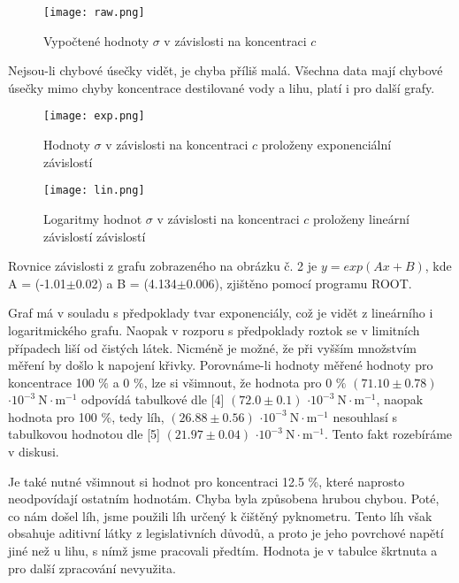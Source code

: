\documentclass[a4paper]{article}
\begin{document}
\begin{figure}[H]
\centering
\texttt{[image: raw.png]}
\caption{Vypočtené hodnoty $\sigma$ v závislosti na koncentraci $c$ }
\end{figure}
\par Nejsou-li chybové úsečky vidět, je chyba příliš malá. Všechna data mají chybové úsečky mimo chyby koncentrace destilované vody a lihu, platí i pro další grafy.
\begin{figure}[H]
\centering
\texttt{[image: exp.png]}
\caption{Hodnoty $\sigma$ v závislosti na koncentraci $c$ proloženy exponenciální závislostí}
\end{figure}

\begin{figure}[H]
\centering
\texttt{[image: lin.png]}
\caption{Logaritmy hodnot $\sigma$ v závislosti na koncentraci $c$ proloženy lineární závislostí závislostí}
\end{figure}
\par Rovnice závislosti z grafu zobrazeného na obrázku č. 2 je $y = exp(Ax+B)$, kde A = (-1.01$\pm$0.02) a B = (4.134$\pm$0.006), zjištěno pomocí programu ROOT.
\par Graf má v souladu s předpoklady tvar exponenciály, což je vidět z lineárního i logaritmického grafu. Naopak v rozporu s předpoklady roztok se v limitních případech liší od čistých látek. Nicméně je možné, že při vyšším množstvím měření by došlo k napojení křivky. Porovnáme-li hodnoty měřené hodnoty pro koncentrace 100 $\%$ a 0 $\%$, lze si všimnout, že hodnota pro 0 $\%$ $(71.10\pm0.78)$ $\cdot 10^{-3} \:  \mathrm {N \cdot m^{-1}}$ odpovídá tabulkové dle [4] $(72.0\pm0.1)$ $\cdot 10^{-3}\:  \mathrm{N \cdot m^{-1}}$, naopak hodnota pro 100 $\%$, tedy líh, $(26.88\pm0.56)$ $\cdot 10^{-3} \:  \mathrm {N \cdot m^{-1}}$ nesouhlasí s tabulkovou hodnotou dle [5] $(21.97\pm0.04)$ $\cdot 10^{-3}\:  \mathrm {N \cdot m^{-1}}$. Tento fakt rozebíráme v diskusi.
\par Je také nutné všimnout si hodnot pro koncentraci 12.5 $\%$, které naprosto neodpovídají ostatním hodnotám. Chyba byla způsobena hrubou chybou. Poté, co nám došel líh, jsme použili líh určený k čištěný pyknometru. Tento líh však obsahuje aditivní látky z legislativních důvodů, a proto je jeho povrchové napětí jiné než u lihu, s nímž jsme pracovali předtím. Hodnota je v tabulce škrtnuta a pro další zpracování nevyužita.
\end{document}
